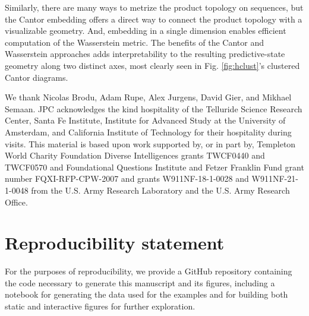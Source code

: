 \documentclass[sigconf, anonymous, review]{acmart}
\begin{document}
Similarly, there are many ways to metrize the product topology on sequences,
but the Cantor embedding offers a direct way to connect the product topology
with a visualizable geometry. And, embedding in a single dimension enables
efficient computation of the Wasserstein metric. The benefits of the Cantor and
Wasserstein approaches adds interpretability to the resulting predictive-state
geometry along two distinct axes, most clearly seen in Fig. \ref{fig:hclust}'s
clustered Cantor diagrams.

\begin{acks}
We thank Nicolas Brodu, Adam Rupe, Alex Jurgens, David Gier, and Mikhael
Semaan. JPC acknowledges the kind hospitality of the Telluride Science
Research Center, Santa Fe Institute, Institute for Advanced Study at the
University of Amsterdam, and California Institute of Technology for their
hospitality during visits. This material is based upon work supported by, or
in part by, Templeton World Charity Foundation Diverse Intelligences grants TWCF0440 and TWCF0570 and Foundational Questions Institute and Fetzer Franklin Fund grant number FQXI-RFP-CPW-2007 and grants W911NF-18-1-0028 and
W911NF-21-1-0048 from the U.S. Army Research Laboratory and the U.S. Army
Research Office.  

\end{acks}

\section{Reproducibility statement}
For the purposes of reproducibility, we provide a GitHub repository containing
the code necessary to generate this manuscript and its figures, including a
notebook for generating the data used for the examples and for building both
static and interactive figures for further exploration.



\end{document}
